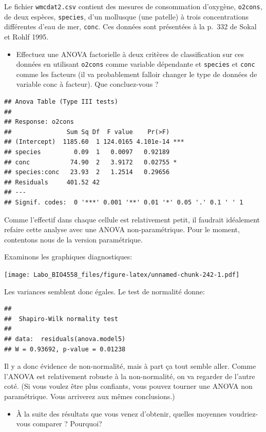 \documentclass[12pt,]{book}
\providecommand{\tightlist}{%
  \setlength{\itemsep}{0pt}\setlength{\parskip}{0pt}}
\begin{document}
Le fichier \texttt{wmcdat2.csv} contient des mesures de consommation d'oxygène, \texttt{o2cons}, de deux espèces, \texttt{species}, d'un mollusque (une patelle) à trois concentrations différentes d'eau de mer, \texttt{conc}. Ces données sont présentées à la p.~332 de Sokal et Rohlf 1995.

\begin{itemize}
\tightlist
\item
  Effectuez une ANOVA factorielle à deux critères de classification sur ces données en utilisant \texttt{o2cons} comme variable dépendante et \texttt{species} et \texttt{conc} comme les facteurs (il va probablement falloir changer le type de données de variable conc à facteur). Que concluez-vous ?
\end{itemize}

\begin{verbatim}
## Anova Table (Type III tests)
## 
## Response: o2cons
##               Sum Sq Df  F value    Pr(>F)    
## (Intercept)  1185.60  1 124.0165 4.101e-14 ***
## species         0.09  1   0.0097   0.92189    
## conc           74.90  2   3.9172   0.02755 *  
## species:conc   23.93  2   1.2514   0.29656    
## Residuals     401.52 42                       
## ---
## Signif. codes:  0 '***' 0.001 '**' 0.01 '*' 0.05 '.' 0.1 ' ' 1
\end{verbatim}

Comme l'effectif dans chaque cellule est relativement petit, il faudrait idéalement refaire cette analyse avec une ANOVA non-paramétrique. Pour le moment, contentons nous de la version paramétrique.

Examinons les graphiques diagnostiques:

\texttt{[image: Labo\_BIO4558\_files/figure-latex/unnamed-chunk-242-1.pdf]}

Les variances semblent donc égales. Le test de normalité donne:

\begin{verbatim}
## 
##  Shapiro-Wilk normality test
## 
## data:  residuals(anova.model5)
## W = 0.93692, p-value = 0.01238
\end{verbatim}

Il y a donc évidence de non-normalité, mais à part ça tout semble aller. Comme l'ANOVA est relativement robuste à la non-normalité, on va regarder de l'autre coté. (Si vous voulez être plus confiants, vous pouvez tourner une ANOVA non paramétrique. Vous arriverez aux mêmes conclusions.)

\begin{itemize}
\tightlist
\item
  À la suite des résultats que vous venez d'obtenir, quelles moyennes voudriez-vous comparer ? Pourquoi?
\end{itemize}
\end{document}
